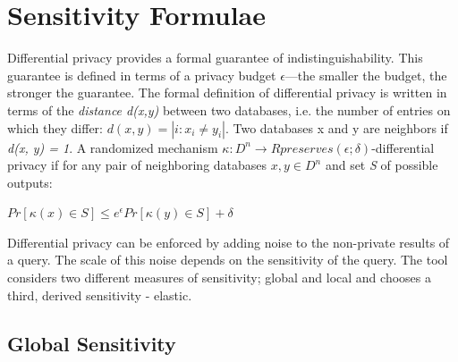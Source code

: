 \documentclass[acmsmall]{acmart}
\begin{document}





\appendix
\section{Sensitivity Formulae}\label{Appendix. A}
Differential privacy provides a formal guarantee of indistinguishability. This guarantee is defined in terms of a privacy budget \begin{math}\epsilon\end{math}—the smaller the budget, the stronger the guarantee. The formal definition of differential privacy is written in terms of the \textit{distance d(x,y)} between two databases, i.e. the number of entries on which they differ: \begin{math}d(x, y) = |i : x_i \neq y_i|\end{math}. Two databases x and y are neighbors if \textit{d(x, y) = 1}. A randomized mechanism \begin{math}\kappa : D^n \rightarrow R preserves (\epsilon; \delta)\end{math}-differential privacy if for any pair of neighboring databases \begin{math}x, y \in D^n\end{math} and set \textit{S} of possible outputs:
\begin{center}
    \begin{math}
        Pr[\kappa(x) \in S] \leq e^\epsilon Pr[\kappa(y) \in S] + \delta
    \end{math}
\end{center}
Differential privacy can be enforced by adding noise to the non-private results of a query. The scale of this noise depends on the sensitivity of the query. The tool considers two different measures of sensitivity; global and local and chooses a third, derived sensitivity - elastic.
\newline

\subsection{Global Sensitivity}
\end{document}
